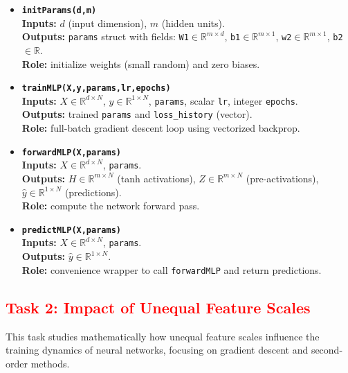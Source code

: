 \documentclass[11pt,a4paper]{article}
\begin{document}
\begin{itemize}
  \item \textbf{\texttt{initParams(d,m)}} \\
    \textbf{Inputs:} $d$ (input dimension), $m$ (hidden units). \\
    \textbf{Outputs:} \texttt{params} struct with fields:
    \texttt{W1}$\in\mathbb{R}^{m\times d}$, \texttt{b1}$\in\mathbb{R}^{m\times1}$,
    \texttt{w2}$\in\mathbb{R}^{m\times1}$, \texttt{b2}$\in\mathbb{R}$. \\
    \textbf{Role:} initialize weights (small random) and zero biases.
  \item \textbf{\texttt{trainMLP(X,y,params,lr,epochs)}} \\
    \textbf{Inputs:} $X\in\mathbb{R}^{d\times N}$, $y\in\mathbb{R}^{1\times N}$,
    \texttt{params}, scalar \texttt{lr}, integer \texttt{epochs}. \\
    \textbf{Outputs:} trained \texttt{params} and \texttt{loss\_history} (vector). \\
    \textbf{Role:} full-batch gradient descent loop using vectorized backprop.
  \item \textbf{\texttt{forwardMLP(X,params)}} \\
    \textbf{Inputs:} $X\in\mathbb{R}^{d\times N}$, \texttt{params}. \\
    \textbf{Outputs:} $H\in\mathbb{R}^{m\times N}$ (tanh activations),
    $Z\in\mathbb{R}^{m\times N}$ (pre-activations),
    $\hat{y}\in\mathbb{R}^{1\times N}$ (predictions). \\
    \textbf{Role:} compute the network forward pass.
  \item \textbf{\texttt{predictMLP(X,params)}} \\
    \textbf{Inputs:} $X\in\mathbb{R}^{d\times N}$, \texttt{params}. \\
    \textbf{Outputs:} $\hat{y}\in\mathbb{R}^{1\times N}$. \\
    \textbf{Role:} convenience wrapper to call \texttt{forwardMLP} and return predictions.
\end{itemize}



\subsection{\textcolor{red}{Task 2: Impact of Unequal Feature Scales}}

This task studies mathematically how unequal feature scales influence the
training dynamics of neural networks, focusing on gradient descent and
second-order methods.
\end{document}
